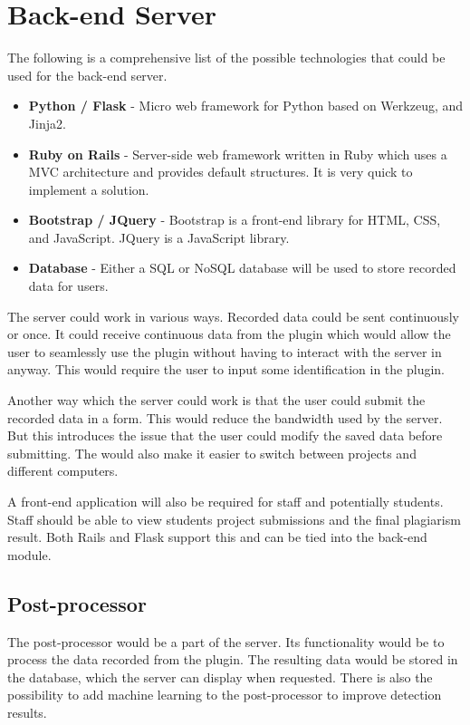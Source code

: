\section{Back-end Server}
The following is a comprehensive list of the possible technologies that could be used for the back-end server.

\begin{itemize}
  \item \textbf{Python / Flask} - Micro web framework for Python based on Werkzeug, and Jinja2.
  \item \textbf{Ruby on Rails} - Server-side web framework written in Ruby which uses a MVC architecture and provides default structures. It is very quick to implement a solution.
  \item \textbf{Bootstrap / JQuery} - Bootstrap is a front-end library for HTML, CSS, and JavaScript. JQuery is a JavaScript library.
  \item \textbf{Database} - Either a SQL or NoSQL database will be used to store recorded data for users.
\end{itemize}

The server could work in various ways. Recorded data could be sent continuously or once. It could receive continuous data from the plugin which would allow the user to seamlessly use the plugin without having to interact with the server in anyway. This would require the user to input some identification in the plugin.

Another way which the server could work is that the user could submit the recorded data in a form. This would reduce the bandwidth used by the server. But this introduces the issue that the user could modify the saved data before submitting. The would also make it easier to switch between projects and different computers.

A front-end application will also be required for staff and potentially students. Staff should be able to view students project submissions and the final plagiarism result. Both Rails and Flask support this and can be tied into the back-end module.

\subsection{Post-processor}
The post-processor would be a part of the server. Its functionality would be to process the data recorded from the plugin. The resulting data would be stored in the database, which the server can display when requested. There is also the possibility to add machine learning to the post-processor to improve detection results.

